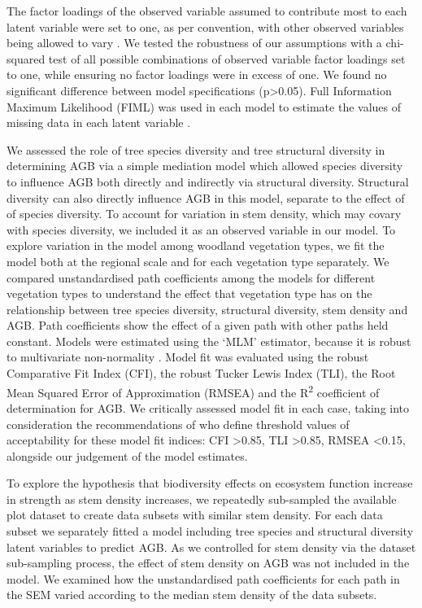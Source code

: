 \documentclass[11pt,a4paper]{article}
\begin{document}
The factor loadings of the observed variable assumed to contribute most to each latent variable were set to one, as per convention, with other observed variables being allowed to vary \citep{Beaujean2014}.  We tested the robustness of our assumptions with a chi-squared test of all possible combinations of observed variable factor loadings set to one, while ensuring no factor loadings were in excess of one. We found no significant difference between model specifications (p>0.05). Full Information Maximum Likelihood (FIML) was used in each model to estimate the values of missing data in each latent variable \citep{Cham2017}.

We assessed the role of tree species diversity and tree structural diversity in determining AGB via a simple mediation model which allowed species diversity to influence AGB both directly and indirectly via structural diversity. Structural diversity can also directly influence AGB in this model, separate to the effect of of species diversity. To account for variation in stem density, which may covary with species diversity, we included it as an observed variable in our model. To explore variation in the model among woodland vegetation types, we fit the model both at the regional scale and for each vegetation type separately. We compared unstandardised path coefficients among the models for different vegetation types to understand the effect that vegetation type has on the relationship between tree species diversity, structural diversity, stem density and AGB. Path coefficients show the effect of a given path with other paths held constant. Models were estimated using the `MLM' estimator, because it is robust to multivariate non-normality \citep{Shapiro1983}. Model fit was evaluated using the robust Comparative Fit Index (CFI), the robust Tucker Lewis Index (TLI), the Root Mean Squared Error of Approximation (RMSEA) and the R\textsuperscript{2} coefficient of determination for AGB. We critically assessed model fit in each case, taking into consideration the recommendations of \citet{Hu1999} who define threshold values of acceptability for these model fit indices: CFI >0.85, TLI >0.85, RMSEA <0.15, alongside our judgement of the model estimates.

To explore the hypothesis that biodiversity effects on ecosystem function increase in strength as stem density increases, we repeatedly sub-sampled the available plot dataset to create \subn{} data subsets with similar stem density. For each data subset we separately fitted a model including tree species and structural diversity latent variables to predict AGB. As we controlled for stem density via the dataset sub-sampling process, the effect of stem density on AGB was not included in the model. We examined how the unstandardised path coefficients for each path in the SEM varied according to the median stem density of the data subsets. 
\end{document}
